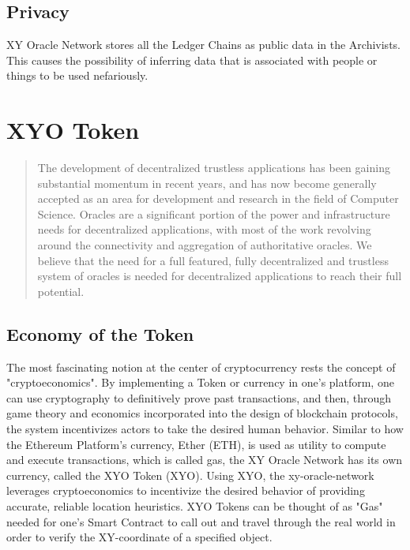 \documentclass{article}
\begin{document}
\subsection {Privacy}
XY Oracle Network stores all the Ledger Chains as public data in the Archivists. This causes the possibility of inferring data that is associated with people or things to be used nefariously.

\section {XYO Token}
\begin{abstract}
The development of decentralized trustless applications has been gaining substantial momentum in recent years, and has now become generally accepted as an area for development and research in the field of Computer Science.  Oracles are a significant portion of the power and infrastructure needs for decentralized applications, with most of the work revolving around the connectivity and aggregation of authoritative oracles.  We believe that the need for a full featured, fully decentralized and trustless system of oracles is needed for decentralized applications to reach their full potential.
\end{abstract}

\subsection {Economy of the Token}
The most fascinating notion at the center of cryptocurrency rests the concept of "\gls{cryptoeconomics}". By implementing a Token or currency in one's platform, one can use cryptography to definitively prove past transactions, and then, through game theory and economics incorporated into the design of blockchain protocols, the system incentivizes actors to take the desired human behavior.
Similar to how the Ethereum Platform's currency, Ether (ETH), is used as utility to compute and execute transactions, which is called \gls{gas}, the XY Oracle Network has its own currency, called the XYO Token (XYO). Using XYO, the \gls{xy-oracle-network} leverages \gls{cryptoeconomics} to incentivize the desired behavior of providing accurate, reliable location heuristics. XYO Tokens can be thought of as "Gas" needed for one's Smart Contract to call out and travel through the real world in order to verify the XY-coordinate of a specified object. 
\end{document}
